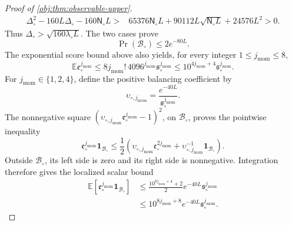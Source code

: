 \begin{proof}[Proof of \cref{obj:thm:observable-upper}]
\[
\begin{aligned}
\Delta_\circ^2-160L\Delta_\circ-160\mathsf N_\circ L
>{}&65376\mathsf N_\circ L
+90112L\sqrt{\mathsf N_\circ L}+24576L^2>0.
\end{aligned}
\]
Thus \(\Delta_\circ>\sqrt{160\lambda_\circ L}\). The two cases prove
\[
\Pr(\mathcal B_\circ)\le2e^{-80L}.
\]
The exponential score bound above also yields, for every integer \(1\le j_{\mathrm{mom}}\le8\),
\[
\mathbb E\mathfrak e_\circ^{j_{\mathrm{mom}}}
\le8j_{\mathrm{mom}}!\,4096^{j_{\mathrm{mom}}}
\mathfrak s_\circ^{j_{\mathrm{mom}}}
\le10^{4j_{\mathrm{mom}}+4}\mathfrak s_\circ^{j_{\mathrm{mom}}}.
\]
For \(j_{\mathrm{mom}}\in\{1,2,4\}\), define the positive balancing coefficient by
\[
\upsilon_{\circ,j_{\mathrm{mom}}}
=\frac{e^{-40L}}{\mathfrak s_\circ^{j_{\mathrm{mom}}}}.
\]
The nonnegative square
\((\upsilon_{\circ,j_{\mathrm{mom}}}\mathfrak e_\circ^{j_{\mathrm{mom}}}-1)^2\), on \(\mathcal B_\circ\), proves the pointwise inequality
\[
\mathfrak e_\circ^{j_{\mathrm{mom}}}\mathbf1_{\mathcal B_\circ}
\le\frac12\left(
\upsilon_{\circ,j_{\mathrm{mom}}}\mathfrak e_\circ^{2j_{\mathrm{mom}}}
+\upsilon_{\circ,j_{\mathrm{mom}}}^{-1}\mathbf1_{\mathcal B_\circ}
\right).
\]
Outside \(\mathcal B_\circ\), its left side is zero and its right side is nonnegative. Integration therefore gives the localized scalar bound
\[
\begin{aligned}
\mathbb E\!\left[
\mathfrak e_\circ^{j_{\mathrm{mom}}}\mathbf1_{\mathcal B_\circ}
\right]
&\le\frac{10^{8j_{\mathrm{mom}}+4}+2}{2}
 e^{-40L}\mathfrak s_\circ^{j_{\mathrm{mom}}}\\
&\le10^{8j_{\mathrm{mom}}+8}
 e^{-40L}\mathfrak s_\circ^{j_{\mathrm{mom}}}.
\end{aligned}
\]


\end{proof}
